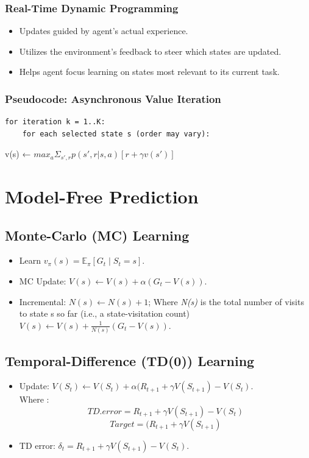 \documentclass[12pt]{article}
\begin{document}
\subsubsection{Real-Time Dynamic Programming}
\begin{itemize}
    \item Updates guided by agent's actual experience.
    \item Utilizes the environment's feedback to steer which states are updated.
    \item Helps agent focus learning on states most relevant to its current task.
\end{itemize}

\subsubsection*{Pseudocode: Asynchronous Value Iteration}
\begin{verbatim}
for iteration k = 1..K:
    for each selected state s (order may vary):
\end{verbatim}
\quad v(s) ← $max_a Σ_{s', r} p(s', r | s, a) [r + γ v(s')]$


\section{Model-Free Prediction }

\subsection{Monte-Carlo (MC) Learning}
\begin{itemize}
    \item Learn $v_\pi(s) = \mathbb{E}_\pi[G_t \mid S_t = s]$.
    \item MC Update: $V(s) \leftarrow V(s) + \alpha (G_t - V(s))$.
    \item Incremental: $N(s) \leftarrow N(s) + 1$; Where \textit{N(s)} is the total number of visits to state s so far (i.e., a state-visitation count)\\ 
    $V(s) \leftarrow V(s) + \frac{1}{N(s)}(G_t - V(s))$.
\end{itemize}

\subsection{Temporal-Difference (TD(0)) Learning}
\begin{itemize}
    \item Update: $V(S_t) \leftarrow V(S_t) + \alpha (R_{t+1} + \gamma V(S_{t+1}) - V(S_t)$.\\
    Where :
    $$TD.error = R_{t+1} + \gamma V(S_{t+1}) - V(S_t)$$
    $$Target = (R_{t+1} + \gamma V(S_{t+1})$$
    \item TD error: $\delta_t = R_{t+1} + \gamma V(S_{t+1}) - V(S_t)$.
\end{itemize}
\end{document}
